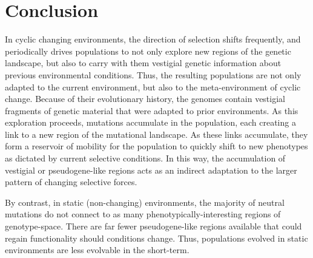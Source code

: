 \documentclass[PhD]{msu-thesis}
\begin{document}

\section{Conclusion}
In cyclic changing environments, the direction of selection shifts frequently, and periodically drives populations to not only explore new regions of the genetic landscape, but also to carry with them vestigial genetic information about previous environmental conditions. Thus, the resulting populations are not only adapted to the current environment, but also to the meta-environment of cyclic change. Because of their evolutionary history, the genomes contain vestigial fragments of genetic material that were adapted to prior environments. As this exploration proceeds, mutations accumulate in the population, each creating a link to a new region of the mutational landscape. As these links accumulate, they form a reservoir of mobility for the population to quickly shift to new phenotypes as dictated by current selective conditions. In this way, the accumulation of vestigial or pseudogene-like regions acts as an indirect adaptation to the larger pattern of changing selective forces.


By contrast, in static (non-changing) environments, the majority of neutral mutations do not connect to as many phenotypically-interesting regions of genotype-space. There are far fewer pseudogene-like regions available that could regain functionality should conditions change. Thus, populations evolved in static environments are less evolvable in the short-term.
\end{document}
